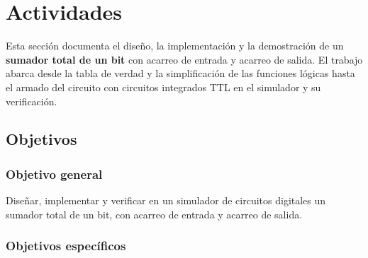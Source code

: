 \documentclass[10pt]{article}
\begin{document}
\newpage
\tableofcontents
\thispagestyle{plain}
\clearpage


\section{Actividades}

\providecommand{\marcocaptura}[2]{%
  \fbox{\parbox[c][#1][c]{0.93\linewidth}{\centering\itshape #2}}}

Esta sección documenta el diseño, la implementación y la demostración de un
\textbf{sumador total de un bit} con acarreo de entrada y acarreo de salida.
El trabajo abarca desde la tabla de verdad y la simplificación de las funciones
lógicas hasta el armado del circuito con circuitos integrados TTL en el
simulador y su verificación.

\subsection{Objetivos}

\subsubsection{Objetivo general}

Diseñar, implementar y verificar en un simulador de circuitos digitales un
sumador total de un bit, con acarreo de entrada y acarreo de salida.

\subsubsection{Objetivos específicos}
\end{document}
